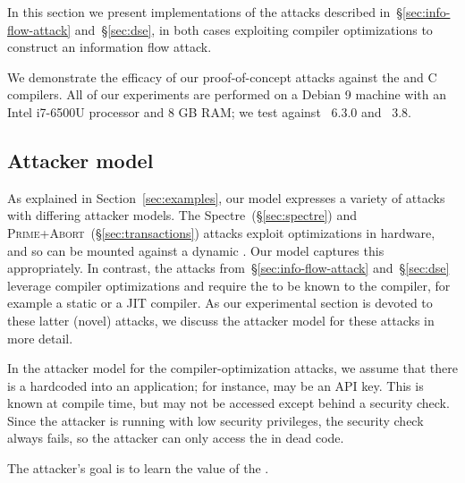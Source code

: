 \documentclass[conference]{IEEEtran}
\theoremstyle{plain}
\theoremstyle{definition}
\newcommand{\ignore}[1]{}
\begin{document}
In this section we present implementations of the attacks described
in~\S\ref{sec:info-flow-attack} and~\S\ref{sec:dse}, in both cases
exploiting compiler optimizations to construct an information flow attack.
\ignore{
The attacker model (detailed in~\S\ref{subsec:attacker-model})
is currently unrealistic, as we attack C compilers rather than scripting
languages, and we require the secret to be a compile-time constant which
the compiler can optimize on.
This renders these attacks proof-of-concepts rather than
immediately exploitable vulnerabilities.
However, we believe their novelty may lead to
interesting discussion, and with much more development, these attacks may
evolve into genuine threats against targets such as JIT compilers.
}
We demonstrate the efficacy of our proof-of-concept attacks against
the {\CLANG} and {\GCC} C compilers.
All of our experiments are performed on a Debian 9 machine with an Intel
i7-6500U processor and 8 GB RAM;
we test against {\GCC}~6.3.0 and {\CLANG}~3.8.

\subsection{Attacker model}
\label{subsec:attacker-model}

As explained in Section~\ref{sec:examples}, our model expresses a variety
of attacks with differing attacker models.
The Spectre~(\S\ref{sec:spectre}) and
\textsc{Prime+Abort}~(\S\ref{sec:transactions}) attacks exploit optimizations
in hardware, and so can be mounted against a dynamic \SEC.
Our model captures this appropriately.
In contrast, the attacks from~\S\ref{sec:info-flow-attack}
and~\S\ref{sec:dse} leverage compiler optimizations and require the \SEC to
be known to the compiler, for example a static \SEC or a JIT compiler.
As our experimental section is devoted to these latter (novel) attacks, we
discuss the attacker model for these attacks in more detail.

In the attacker model for the compiler-optimization attacks, we assume that
there is a {\SEC} hardcoded into an application; for instance, {\SEC} may be
an API key.
This {\SEC} is known at compile time, but may not be
accessed except behind a security check.
Since the attacker is running with low security privileges,
the security check always fails,
so the attacker can only access the {\SEC} in dead code.
\ignore{
The attacker has no capabilities other than writing and executing code --- in
particular the attacker may not disassemble the compiler or libraries to learn
the {\SEC} directly; may not examine the internal state of the compiler;
may not access timers of any kind; and may not leverage hardware side channels.
}
The attacker's goal is to learn the value of the {\SEC}.
\end{document}
